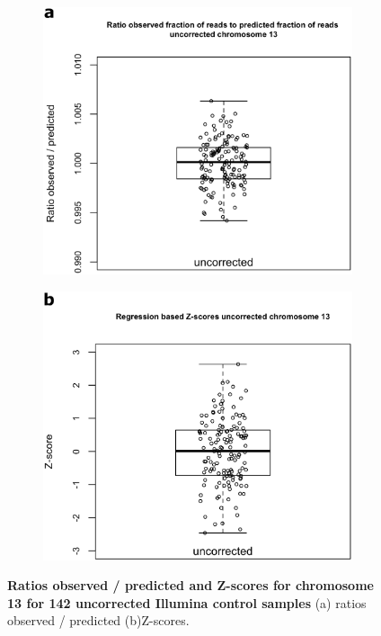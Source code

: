 \begin{figure}[h]
	\begin{subfigure}{.5\textwidth}
		\centering
		\includegraphics[width=1\linewidth]{img/NIPT_Supp3_Fig3_3a}
		\label{fig:NIPT_Supp3_Fig3_3a}
	\end{subfigure}%
	\begin{subfigure}{.5\textwidth}
		\centering
		\includegraphics[width=1\linewidth]{img/NIPT_Supp3_Fig3_3b}
		\label{fig:NIPT_Supp3_Fig3_3b}
	\end{subfigure} 
	\caption[Ratios observed / predicted and Z-scores for chromosome 13]{\textbf{Ratios observed / predicted and Z-scores for chromosome 13 for 142 uncorrected Illumina control samples} (a) ratios observed / predicted (b)Z-scores.}
	\label{fig:NIPT_Supp3_Fig3_3}
\end{figure}


